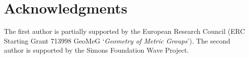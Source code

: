 \documentclass[10pt, a4paper,
oneside, headinclude,footinclude]{scrartcl}
\begin{document}
\printbibliography

\section*{Acknowledgments} The first author is partially supported by the European Research Council (ERC Starting Grant 713998 GeoMeG `\emph{Geometry of Metric Groups}'). The second author is supported by the Simons Foundation Wave Project. 
\end{document}
